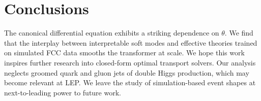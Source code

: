 \section{Conclusions}\label{sec:conclusions}

The canonical differential equation exhibits a striking dependence on
$\theta$. We find that the interplay between interpretable soft modes
and effective theories trained on simulated FCC data smooths the
transformer at scale. We hope this work inspires further research into
closed-form optimal transport solvers. Our analysis neglects groomed
quark and gluon jets of double Higgs production, which may become
relevant at LEP. We leave the study of simulation-based event shapes at
next-to-leading power to future work.


